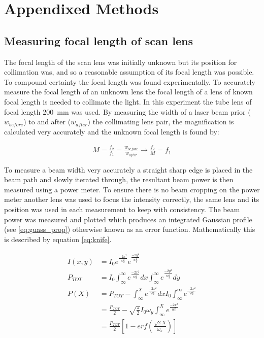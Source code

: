 
\ifpdf
    \graphicspath{{Appendix1/Figs/Raster/}{Appendix1/Figs/PDF/}{Appendix1/Figs/}}
\else
    \graphicspath{{Appendix1/Figs/Vector/}{Appendix1/Figs/}}
\fi

\chapter{Appendixed Methods}
\section{Measuring focal length of scan lens}\label{appendix:scanlens}

The focal length of the scan lens was initially unknown but its position for collimation was, and so a reasonable assumption of its focal length was possible.
To compound certainty the focal length was found experimentally.
To accurately measure the focal length of an unknown lens the focal length of a lens of known focal length is needed to collimate the light.
In this experiment the tube lens of focal length \SI{200}{\milli\meter} was used.
By measuring the width of a laser beam prior ($w_{before}$) to and after ($w_{after}$) the collimating lens pair, the magnification is calculated very accurately and the unknown focal length is found by:

\begin{align}
	M=\frac{f_2}{f_1}=\frac{w_{before}}{w_{after}}  \rightarrow \frac{f_2}{M} =f_{1}
\end{align}

To measure a beam width very accurately a straight sharp edge is placed in the beam path and slowly iterated through, the resultant beam power is then measured using a power meter.
To ensure there is no beam cropping on the power meter another lens was used to focus the intensity correctly, the same lens and its position was used in each measurement to keep with consistency.
The beam power was measured and plotted which produces an integrated Gaussian profile (see \eqref{eq:guass_prop}) otherwise known as an error function.
Mathematically this is described by equation \eqref{eq:knife}.

\begin{align}
	I(x,y) &= I_0 e^{\frac{-2x^2}{w_x^2}}e^{\frac{-2y^2}{w_y^2}}\label{eq:guass_prop}\\\nonumber
	P_{TOT} &= I_0 \int_{\infty}^{\infty}e^{\frac{-2x^2}{w_x^2}} dx \int_{\infty}^{\infty}e^{\frac{-2y^2}{w_y^2}} dy\\\nonumber
	P(X) &= P_{TOT} - \int_{\infty}^{X}e^{\frac{-2x^2}{w_x^2}} dx I_0 \int_{\infty}^{\infty}e^{\frac{-2x^2}{w_x^2}} \\\nonumber
	&= \frac{P_{TOT}}{2} - \sqrt{\frac{\pi}{2}} I_0 \omega_y \int_{\infty}^{X}e^{\frac{-2x^2}{w_x^2}}\\
	& = \frac{P_{TOT}}{2} \left[1 - erf\left(\frac{\sqrt{2}X}{\omega_x}\right) \right] \label{eq:knife}
\end{align}

